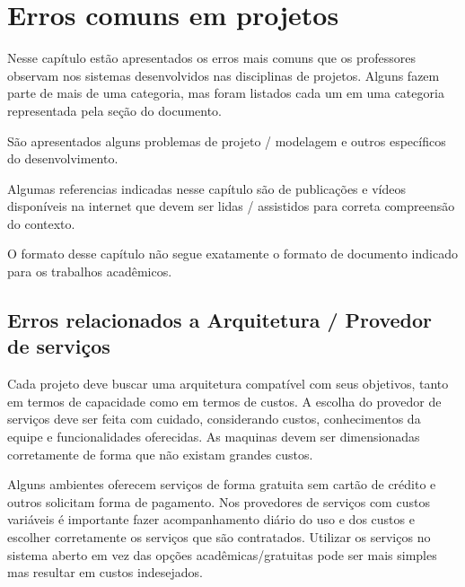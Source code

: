\newcommand{\video}[2]{\href{#1}{Vídeo: #2}}

\newcommand{\erroArmazenarSenhaAberta}[0]{armazenamento de senhas abertas (ou com criptografia reversível) no banco de dados sem \textit{hash} \cite{password_storage_cheat_sheet}}    



\chapter{Erros comuns em projetos}
\label{erros-projetos}

Nesse capítulo estão apresentados os erros mais comuns que os professores observam nos sistemas desenvolvidos nas disciplinas de projetos. Alguns fazem parte de mais de uma categoria, mas foram listados cada um em uma categoria representada pela seção do documento.

São apresentados alguns problemas de projeto / modelagem e outros específicos do desenvolvimento.

Algumas referencias indicadas nesse capítulo são de publicações e vídeos disponíveis na internet que devem ser lidas / assistidos para correta compreensão do contexto.

O formato desse capítulo não segue exatamente o formato de documento indicado para os trabalhos acadêmicos.


\section{Erros relacionados a Arquitetura / Provedor de serviços}

Cada projeto deve buscar uma arquitetura compatível com seus objetivos, tanto em termos de capacidade como em termos de custos. A escolha do provedor de serviços deve ser feita com cuidado, considerando custos, conhecimentos da equipe e funcionalidades oferecidas. As maquinas devem ser dimensionadas corretamente de forma que não existam grandes custos.

Alguns ambientes oferecem serviços de forma gratuita sem cartão de crédito e outros solicitam forma de pagamento. Nos provedores de serviços com custos variáveis é importante fazer acompanhamento diário do uso e dos custos e escolher corretamente os serviços que são contratados. Utilizar os serviços no sistema aberto em vez das opções acadêmicas/gratuitas pode ser mais simples mas resultar em custos indesejados. 

